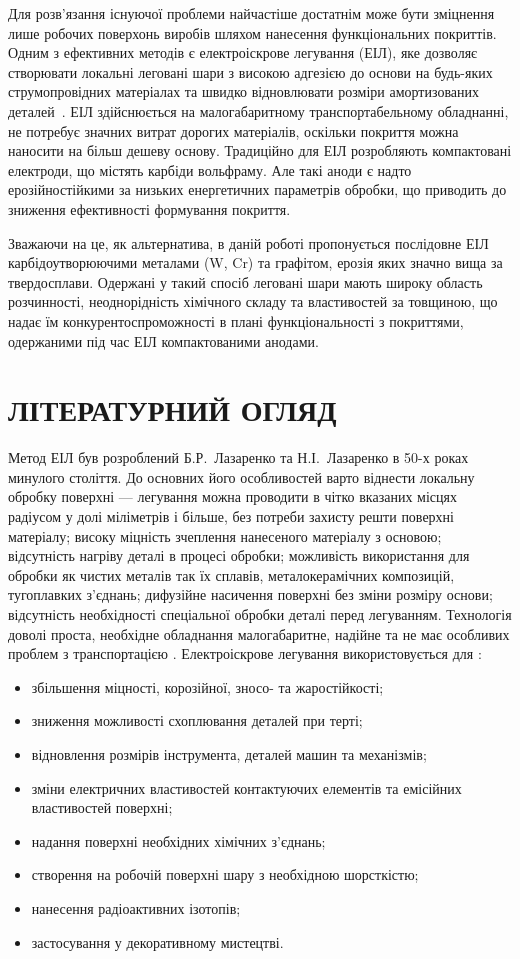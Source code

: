 \documentclass[a4paper,fontsize=14bp,ukrainian]{extreport}
\begin{document}
Для розв'язання існуючої проблеми найчастіше достатнім може бути зміцнення лише робочих поверхонь виробів шляхом нанесення функціональних покриттів. Одним з ефективних методів є електроіскрове легування (ЕІЛ), яке дозволяє створювати локальні леговані шари з високою адгезією до основи на будь-яких струмопровідних матеріалах та швидко відновлювати розміри амортизованих деталей~\cite{hitlevich1985}. ЕІЛ здійснюється на малогабаритному транспортабельному обладнанні, не потребує значних витрат дорогих матеріалів, оскільки покриття можна наносити на більш дешеву основу. Традиційно для ЕІЛ розробляють компактовані електроди, що містять карбіди вольфраму. Але такі аноди є надто ерозійностійкими за низьких енергетичних параметрів обробки, що приводить до зниження ефективності формування покриття.

Зважаючи на це, як альтернатива, в даній роботі пропонується послідовне ЕІЛ карбідоутворюючими металами (W, Cr) та графітом, ерозія яких значно вища за твердосплави. Одержані у такий спосіб леговані шари мають широку область розчинності, неоднорідність хімічного складу та властивостей за товщиною, що надає їм конкурентоспроможності в плані функціональності з покриттями, одержаними під час ЕІЛ компактованими анодами.

\chapter{ЛІТЕРАТУРНИЙ ОГЛЯД}

Метод ЕІЛ був розроблений Б.Р.~Лазаренко та Н.І.~Лазаренко в 50-х роках минулого століття. До основних його особливостей варто віднести локальну обробку поверхні --- легування  можна проводити в чітко вказаних місцях радіусом у долі міліметрів і більше, без потреби захисту решти поверхні матеріалу; високу міцність зчеплення нанесеного матеріалу з основою; відсутність нагріву деталі в процесі обробки; можливість використання для обробки як чистих металів так їх сплавів, металокерамічних композицій, тугоплавких з'єднань; дифузійне насичення поверхні без зміни розміру основи; відсутність необхідності спеціальної обробки деталі перед легуванням. Технологія доволі проста, необхідне обладнання малогабаритне, надійне та не має особливих проблем з транспортацією \cite{hitlevich1985}.
Електроіскрове легування використовується для \cite{hitlevich1985}: %
\begin{itemize}
\item збільшення міцності, корозійної, зносо- та жаростійкості;
\item зниження можливості схоплювання деталей при терті;
\item відновлення розмірів інструмента, деталей машин та механізмів;
\item зміни електричних властивостей контактуючих елементів та емісійних властивостей поверхні;
\item надання поверхні необхідних хімічних з'єднань;
\item створення на робочій поверхні шару з необхідною шорсткістю;
\item нанесення радіоактивних ізотопів;
\item застосування у декоративному мистецтві.
\end{itemize}
\end{document}
